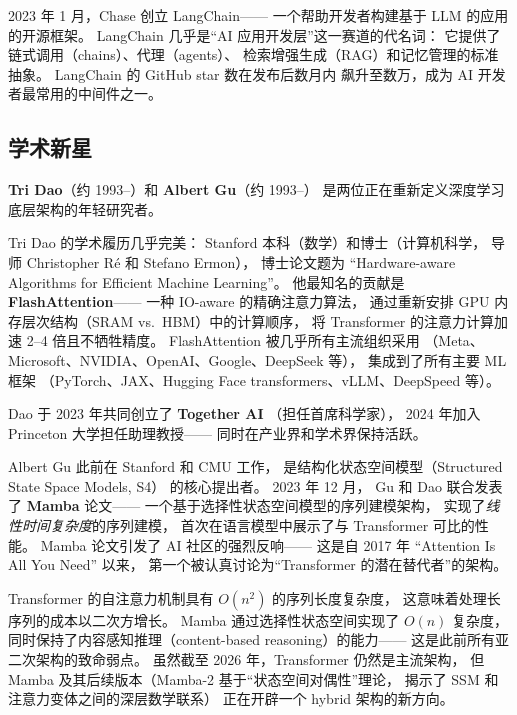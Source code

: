 2023 年 1 月，Chase 创立 LangChain——
一个帮助开发者构建基于 LLM 的应用的开源框架。
LangChain 几乎是``AI 应用开发层''这一赛道的代名词：
它提供了链式调用（chains）、代理（agents）、
检索增强生成（RAG）和记忆管理的标准抽象。
LangChain 的 GitHub star 数在发布后数月内
飙升至数万，成为 AI 开发者最常用的中间件之一。

\subsection{学术新星}

\textbf{Tri Dao}（约 1993--）和 \textbf{Albert Gu}（约 1993--）
是两位正在重新定义深度学习底层架构的年轻研究者。

Tri Dao 的学术履历几乎完美：
Stanford 本科（数学）和博士（计算机科学，
导师 Christopher Ré 和 Stefano Ermon），
博士论文题为 ``Hardware-aware Algorithms for Efficient Machine Learning''。
他最知名的贡献是 \textbf{FlashAttention}——
一种 IO-aware 的精确注意力算法，
通过重新安排 GPU 内存层次结构（SRAM vs.\ HBM）中的计算顺序，
将 Transformer 的注意力计算加速 2--4 倍且不牺牲精度。
FlashAttention 被几乎所有主流组织采用
（Meta、Microsoft、NVIDIA、OpenAI、Google、DeepSeek 等），
集成到了所有主要 ML 框架
（PyTorch、JAX、Hugging Face transformers、vLLM、DeepSpeed 等）。

Dao 于 2023 年共同创立了 \textbf{Together AI}
（担任首席科学家），
2024 年加入 Princeton 大学担任助理教授——
同时在产业界和学术界保持活跃。

Albert Gu 此前在 Stanford 和 CMU 工作，
是结构化状态空间模型（Structured State Space Models, S4）
的核心提出者。
2023 年 12 月，
Gu 和 Dao 联合发表了 \textbf{Mamba} 论文——
一个基于选择性状态空间模型的序列建模架构，
实现了\emph{线性时间复杂度}的序列建模，
首次在语言模型中展示了与 Transformer 可比的性能。
Mamba 论文引发了 AI 社区的强烈反响——
这是自 2017 年 ``Attention Is All You Need'' 以来，
第一个被认真讨论为``Transformer 的潜在替代者''的架构。

\begin{whybox}
Transformer 的自注意力机制具有 $O(n^2)$ 的序列长度复杂度，
这意味着处理长序列的成本以二次方增长。
Mamba 通过选择性状态空间实现了 $O(n)$ 复杂度，
同时保持了内容感知推理（content-based reasoning）的能力——
这是此前所有亚二次架构的致命弱点。
虽然截至 2026 年，Transformer 仍然是主流架构，
但 Mamba 及其后续版本（Mamba-2 基于``状态空间对偶性''理论，
揭示了 SSM 和注意力变体之间的深层数学联系）
正在开辟一个 hybrid 架构的新方向。
\end{whybox}


